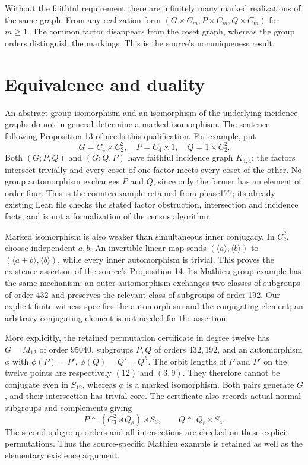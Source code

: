 \documentclass[11pt]{article}
\theoremstyle{definition}\newtheorem{definition}[theorem]{Definition}
\begin{document}
Without the faithful requirement there are infinitely many marked
realizations of the same graph.  From any realization form
$(G\times C_m;P\times C_m,Q\times C_m)$ for $m\ge1$.  The common
factor disappears from the coset graph, whereas the group orders
distinguish the markings.  This is the source's nonuniqueness result.

\section{Equivalence and duality}
An abstract group isomorphism and an isomorphism of the underlying
incidence graphs do not in general determine a marked isomorphism.
The sentence following Proposition 13 of \cite{L059} needs this
qualification.  For example, put
\[
 G=C_4\times C_2^2,\quad P=C_4\times1,\quad Q=1\times C_2^2.
\]
Both $(G;P,Q)$ and $(G;Q,P)$ have faithful incidence graph $K_{4,4}$:
the factors intersect trivially and every coset of one factor meets
every coset of the other.  No group automorphism exchanges $P$ and
$Q$, since only the former has an element of order four.  This is
the counterexample retained from phase177; its already existing Lean
file checks the stated factor obstruction, intersection and incidence
facts, and is not a formalization of the census algorithm.

Marked isomorphism is also weaker than simultaneous inner conjugacy.
In $C_2^2$, choose independent $a,b$.  An invertible linear map sends
$(\langle a\rangle,\langle b\rangle)$ to
$(\langle a+b\rangle,\langle b\rangle)$, while every inner
automorphism is trivial.  This proves the existence assertion of
the source's Proposition 14.  Its Mathieu-group example has the
same mechanism: an outer automorphism exchanges two classes of
subgroups of order 432 and preserves the relevant class of subgroups
of order 192.  Our explicit finite witness specifies the automorphism
and the conjugating element; an arbitrary conjugating element is
not needed for the assertion.

More explicitly, the retained permutation certificate in degree
twelve has $G=M_{12}$ of order $95040$, subgroups $P,Q$ of orders
$432,192$, and an automorphism $\phi$ with
$\phi(P)=P'$, $\phi(Q)=Q'=Q^h$.  The orbit lengths of $P$ and
$P'$ on the twelve points are respectively $(12)$ and $(3,9)$.
They therefore cannot be conjugate even in $S_{12}$, whereas
$\phi$ is a marked isomorphism.  Both pairs generate $G$, and
their intersection has trivial core.  The certificate also records
actual normal subgroups and complements giving
\[
 P\cong (C_3^2\rtimes Q_8)\rtimes S_3,
 \qquad Q\cong Q_8\rtimes S_4.
\]
The second subgroup orders and all intersections are checked on
these explicit permutations.  Thus the source-specific Mathieu
example is retained as well as the elementary existence argument.
\end{document}
